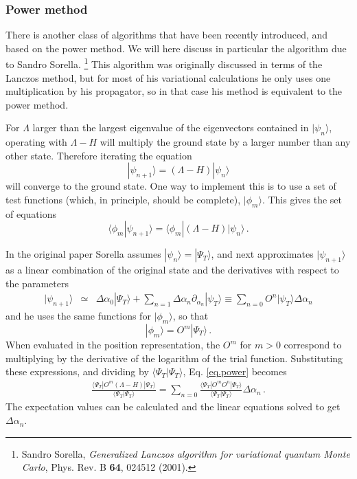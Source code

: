 \subsubsection{Power method}
There is another class of algorithms that have been recently introduced, and based on the power method. We will here discuss in particular the algorithm due to Sandro Sorella.
\footnote{Sandro Sorella, {\em Generalized Lanczos algorithm for
variational quantum Monte Carlo}, Phys. Rev. B {\bf 64}, 024512 (2001).}
This algorithm was originally discussed in terms of
the Lanczos method, but for most of his variational calculations
he only uses one multiplication by his propagator, so in that case
his method is equivalent
to the power method.

For $\Lambda$ larger than the largest eigenvalue of the
eigenvectors contained in $|\psi_n\rangle$, operating
with $\Lambda -H$ will multiply the ground state by a larger number
than any other state. Therefore iterating the equation
\begin{equation}
|\psi_{n+1}\rangle = (\Lambda-H)|\psi_n\rangle
\end{equation}
will converge to the ground state.
One way to implement this is to use a set of test functions (which, in
principle, should be complete), $|\phi_m\rangle$. This gives the
set of equations
\begin{equation}
\label{eq.power}
\langle \phi_m |\psi_{n+1}\rangle = \langle \phi_m |(\Lambda -H)|\psi_n\rangle
\,.
\end{equation}


In the original paper Sorella assumes $|\psi_n \rangle = |\Psi_T\rangle$, and next approximates
$|\psi_{n+1}\rangle$ as a linear combination of the original state
and the derivatives with respect to the parameters
\begin{eqnarray}
|\psi_{n+1}\rangle &\simeq& \Delta \alpha_0 |\Psi_T\rangle
+\sum_{n=1} \Delta \alpha_n \partial_{\alpha_n} |\psi_T\rangle
\equiv \sum_{n=0} O^n |\psi_T\rangle \Delta \alpha_n
\end{eqnarray}
and he uses the same functions for $|\phi_m\rangle$, so that
\begin{equation}
|\phi_m\rangle = O^m |\Psi_T\rangle \,.
\end{equation}
When evaluated in the position representation, the $O^m$ for $m>0$ correspond
to multiplying by the derivative of the logarithm of the trial function.
Substituting these expressions, and dividing by $\langle \Psi_T|\Psi_T\rangle$,
Eq. \ref{eq.power} becomes
\begin{eqnarray}
\label{eq.first}
\frac{\langle \Psi_T |O^m (\Lambda-H) |\Psi_T\rangle}
{\langle \Psi_T |\Psi_T\rangle}
= \sum_{n=0} \frac{\langle \Psi_T |O^m O^n |\Psi_T\rangle}
{\langle \Psi_T |\Psi_T\rangle} \Delta \alpha_n\,.
\end{eqnarray}
The expectation values can be calculated and the linear equations solved
to get $\Delta \alpha_n$.

